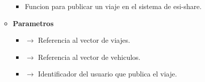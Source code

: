 \begin{itemize}
\begin{itemize}
        \begin{itemize}
			\item Funcion para publicar un viaje en el sistema de esi-share.
		\end{itemize}
		\item \textbf{Parametros}
		\begin{itemize}
			\item {}  $\rightarrow$ Referencia al vector de viajes.
            \item {} $\rightarrow$ Referencia al vector de vehiculos.
            \item {} $\rightarrow$ Identificador del usuario que publica el viaje.
		\end{itemize}
	\end{itemize}


\end{itemize}
